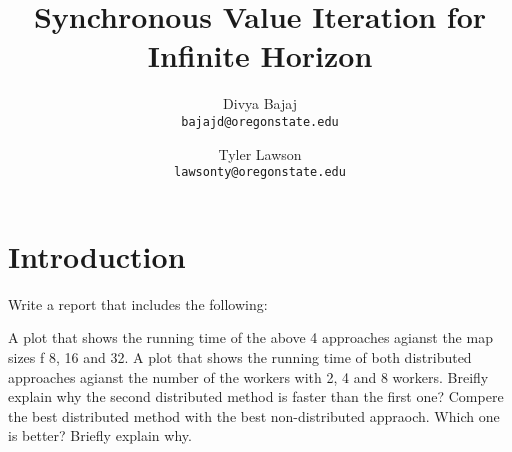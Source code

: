 \documentclass{article}
\title{Synchronous Value Iteration for Infinite Horizon}
\author{
Divya Bajaj\\
\texttt{bajajd@oregonstate.edu}
\and
Tyler  Lawson\\
\texttt{lawsonty@oregonstate.edu}
}
\begin{document}
\maketitle

\section{Introduction}

Write a report that includes the following:

A plot that shows the running time of the above 4 approaches agianst the map sizes f 8, 16 and 32.
A plot that shows the running time of both distributed approaches agianst the number of the workers with 2, 4 and 8 workers.
Breifly explain why the second distributed method is faster than the first one?
Compere the best distributed method with the best non-distributed appraoch. Which one is better? Briefly explain why.
\end{document}
